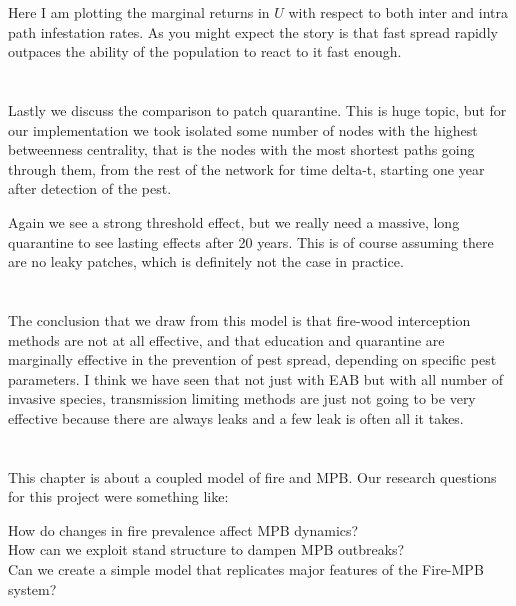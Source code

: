 \documentclass{article}
\begin{document}
Here I am plotting the marginal returns in $U$ with respect to both inter and intra path infestation rates. As you might expect the story is that fast spread rapidly outpaces the ability of the population to react to it fast enough. 

\section{}

Lastly we discuss the comparison to patch quarantine. This is huge topic, but for our implementation we took isolated some number of nodes with the highest betweenness centrality, that is the nodes with the most shortest paths going through them, from the rest of the network for time delta-t, starting one year after detection of the pest.

Again we see a strong threshold effect, but we really need a massive, long quarantine to see lasting effects after 20 years. This is of course assuming there are no leaky patches, which is definitely not the case in practice.

\section{}

The conclusion that we draw from this model is that fire-wood interception methods are not at all effective, and that education and quarantine are marginally effective in the prevention of pest spread, depending on specific pest parameters. I think we have seen that not just with EAB but with all number of invasive species, transmission limiting methods are just not going to be very effective because there are always leaks and a few leak is often all it takes. 

\section{}

This chapter is about a coupled model of fire and MPB. Our research questions for this project were something like:

How do changes in fire prevalence affect MPB dynamics?   \\
\vspace{0.5cm}
How can we exploit stand structure to dampen MPB outbreaks? \\
\vspace{0.5cm}
Can we create a simple model that replicates major features of the Fire-MPB system?
\end{document}
